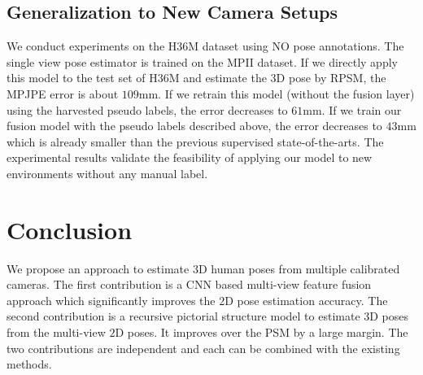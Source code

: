 \documentclass[10pt,twocolumn,letterpaper]{article}
\begin{document}
\subsection{Generalization to New Camera Setups}
We conduct experiments on the H36M dataset using NO pose annotations. The single view pose estimator \cite{simplebaselines} is trained on the MPII dataset. If we directly apply this model to the test set of H36M and estimate the $3$D pose by RPSM, the MPJPE error is about $109$mm. If we retrain this model (without the fusion layer) using the harvested pseudo labels, the error decreases to $61$mm. If we train our fusion model with the pseudo labels described above, the error decreases to $43$mm which is already smaller than the previous supervised state-of-the-arts. The experimental results validate the feasibility of applying our model to new environments without any manual label. 

\section{Conclusion}
We propose an approach to estimate $3$D human poses from multiple calibrated cameras. The first contribution is a CNN based multi-view feature fusion approach which significantly improves the $2$D pose estimation accuracy. The second contribution is a recursive pictorial structure model to estimate $3$D poses from the multi-view $2$D poses. It improves over the PSM by a large margin. The two contributions are independent and each can be combined with the existing methods.

{\small


}
\end{document}
